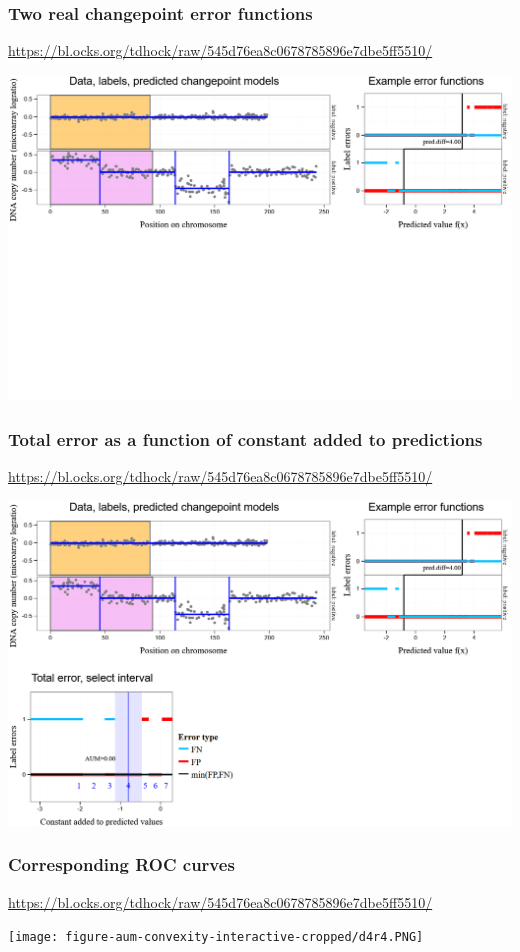 \documentclass[t]{beamer}
\begin{document}
\begin{frame}
  \frametitle{Two real changepoint error functions}
  {\scriptsize\url{https://bl.ocks.org/tdhock/raw/545d76ea8c0678785896e7dbe5ff5510/}}

  \includegraphics[width=\textwidth]{figure-aum-convexity-interactive-cropped/d4r4-2.PNG}
\end{frame}

\begin{frame}
  \frametitle{Total error as a function of constant added to predictions}
  {\scriptsize\url{https://bl.ocks.org/tdhock/raw/545d76ea8c0678785896e7dbe5ff5510/}}

  \includegraphics[width=\textwidth]{figure-aum-convexity-interactive-cropped/d4r4-3.PNG}
\end{frame}

\begin{frame}
  \frametitle{Corresponding ROC curves}
  {\scriptsize\url{https://bl.ocks.org/tdhock/raw/545d76ea8c0678785896e7dbe5ff5510/}}

  \texttt{[image: figure-aum-convexity-interactive-cropped/d4r4.PNG]}
\end{frame}
\end{document}
